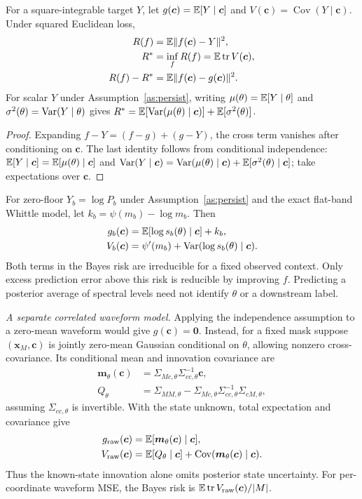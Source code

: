 \begin{proposition}\label{prop:decomp}
For a square-integrable target $Y$, let $g(\bm{c})=\mathbb{E}[Y\mid\bm{c}]$ and
$V(\bm{c})=\operatorname{Cov}(Y\mid\bm{c})$. Under squared Euclidean loss,
\begin{align*}
R(f)&=\mathbb{E}\|f(\bm{c})-Y\|^2,\\
R^*&=\inf_f R(f)=\mathbb{E}\operatorname{tr}V(\bm{c}),\\
R(f)-R^*&=\mathbb{E}\|f(\bm{c})-g(\bm{c})\|^2.
\end{align*}
For scalar $Y$ under Assumption~\ref{as:persist}, writing
$\mu(\theta)=\mathbb{E}[Y\mid\theta]$ and $\sigma^2(\theta)=\operatorname{Var}(Y\mid\theta)$ gives
$R^*=\mathbb{E}[\operatorname{Var}(\mu(\theta)\mid\bm{c})]+\mathbb{E}[\sigma^2(\theta)]$.
\end{proposition}
\begin{proof}
Expanding $f-Y=(f-g)+(g-Y)$, the cross term vanishes after conditioning on $\bm{c}$.
The last identity follows from conditional independence:
$\mathbb{E}[Y\mid\bm{c}]=\mathbb{E}[\mu(\theta)\mid\bm{c}]$ and
$\operatorname{Var}(Y\mid\bm{c})=\operatorname{Var}(\mu(\theta)\mid\bm{c})+\mathbb{E}[\sigma^2(\theta)\mid\bm{c}]$; take
expectations over $\bm{c}$.
\end{proof}
\noindent For zero-floor $Y_b=\log P_b$ under Assumption~\ref{as:persist} and the exact
flat-band Whittle model, let $k_b=\psi(m_b)-\log m_b$. Then
\begin{align*}
g_b(\bm{c})&=\mathbb{E}[\log s_b(\theta)\mid\bm{c}]+k_b,\\
V_b(\bm{c})&=\psi'(m_b)+\operatorname{Var}(\log s_b(\theta)\mid\bm{c}).
\end{align*}
Both terms in the Bayes risk are irreducible for a fixed observed context. Only excess
prediction error above this risk is reducible by improving $f$. Predicting a posterior average
of spectral levels need not identify $\theta$ or a downstream label.

\noindent\emph{A separate correlated waveform model.} Applying the independence assumption
to a zero-mean waveform would give $g(\bm{c})=\bm{0}$. Instead, for a fixed mask suppose
$(\bm{x}_M,\bm{c})$ is jointly zero-mean Gaussian conditional on $\theta$, allowing nonzero
cross-covariance. Its conditional mean and innovation covariance are
\begin{align*}
\bm{m}_\theta(\bm{c})&=\Sigma_{Mc,\theta}\Sigma_{cc,\theta}^{-1}\bm{c},\\
Q_\theta&=\Sigma_{MM,\theta}
-\Sigma_{Mc,\theta}\Sigma_{cc,\theta}^{-1}\Sigma_{cM,\theta},
\end{align*}
assuming $\Sigma_{cc,\theta}$ is invertible. With the state unknown, total expectation and
covariance give
\begin{align*}
g_{\mathrm{raw}}(\bm{c})&=\mathbb{E}[\bm{m}_\theta(\bm{c})\mid\bm{c}],\\
V_{\mathrm{raw}}(\bm{c})&=\mathbb{E}[Q_\theta\mid\bm{c}]
+\operatorname{Cov}(\bm{m}_\theta(\bm{c})\mid\bm{c}).
\end{align*}
Thus the known-state innovation alone omits posterior state uncertainty. For per-coordinate
waveform MSE, the Bayes risk is $\mathbb{E}\operatorname{tr}V_{\mathrm{raw}}(\bm{c})/|M|$.

